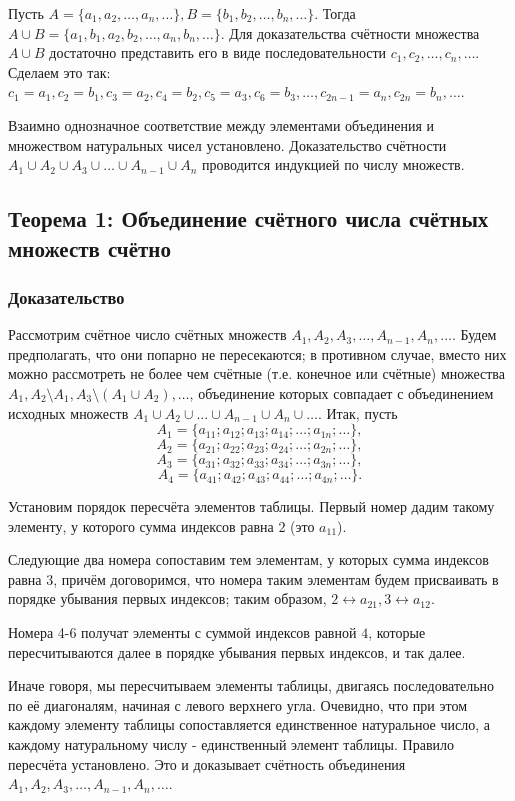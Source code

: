 \documentclass{article}
\begin{document}
Пусть ${A = \{a_1, a_2, \dots, a_n, \dots \}}, {B = \{b_1, b_2, \dots, b_n, \dots\}}$. Тогда ${A \cup B = \{a_1, b_1, a_2, b_2, \dots, a_n, b_n, \dots\}}$. Для доказательства счётности множества $A \cup B$ достаточно представить его в виде последовательности $c_1, c_2, \dots, c_n, \dots$. Сделаем это так: $c_1 = a_1, c_2 = b_1, c_3 = a_2, c_4 = b_2, c_5 = a_3, c_6 = b_3, \dots, c_{2n-1} = a_n, c_{2n} = b_n, \dots$.

Взаимно однозначное соответствие между элементами объединения и множеством натуральных чисел установлено. Доказательство счётности $A_1 \cup A_2 \cup A_3 \cup \dots \cup A_{n-1} \cup A_n$ проводится индукцией по числу множеств.

\subsection{Теорема 1: Объединение счётного числа счётных множеств счётно}
\subsubsection*{Доказательство}
Рассмотрим счётное число счётных множеств $A_1, A_2, A_3, \dots, A_{n-1}, A_n, \dots$. Будем предполагать, что они попарно не пересекаются; в противном случае, вместо них можно рассмотреть не более чем счётные (т.е. конечное или счётные) множества ${A_1, A_2 \setminus A_1, A_3 \setminus (A_1 \cup A_2), \dots}$, объединение которых совпадает с объединением исходных множеств ${A_1 \cup A_2 \cup ... \cup A_{n-1} \cup A_n \cup \dots}$. Итак, пусть \[
	A_1 = \{a_{11}; a_{12}; a_{13}; a_{14}; \dots; a_{1n}; \dots \}, \]\[
	A_2 = \{a_{21}; a_{22}; a_{23}; a_{24}; \dots; a_{2n}; \dots \}, \]\[
	A_3 = \{a_{31}; a_{32}; a_{33}; a_{34}; \dots; a_{3n}; \dots \}, \]\[
	A_4 = \{a_{41}; a_{42}; a_{43}; a_{44}; \dots; a_{4n}; \dots \}.
\]	

Установим порядок пересчёта элементов таблицы. Первый номер дадим такому элементу, у которого сумма индексов равна $2$ (это $a_{11}$). 

Следующие два номера сопоставим тем элементам, у которых сумма индексов равна $3$, причём договоримся, что номера таким элементам будем присваивать в порядке убывания первых индексов; таким образом, $2 \leftrightarrow a_{21}, 3 \leftrightarrow a_{12}$. 

Номера 4-6 получат элементы с суммой индексов равной $4$, которые пересчитываются далее в порядке убывания первых индексов, и так далее.

Иначе говоря, мы пересчитываем элементы таблицы, двигаясь последовательно по её диагоналям, начиная с левого верхнего угла. Очевидно, что при этом каждому элементу таблицы сопоставляется единственное натуральное число, а каждому натуральному числу - единственный элемент таблицы. Правило пересчёта установлено. Это и доказывает счётность объединения $A_1, A_2, A_3, \dots, A_{n-1}, A_n, \dots$.
\end{document}
